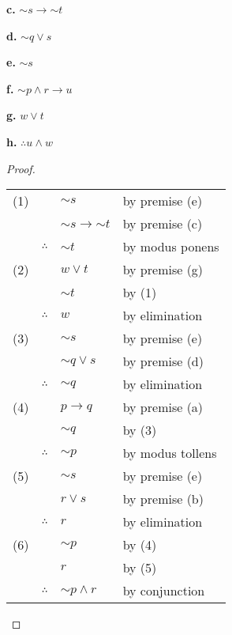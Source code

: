 \documentclass[14pt]{extarticle}
\begin{document}
{\bf c.} ${\sim s} \to {\sim t}$

{\bf d.} ${\sim q} \vee s$

{\bf e.} ${\sim s}$

{\bf f.} ${\sim p} \wedge r \to u$

{\bf g.} $w \vee t$

{\bf h.} $\therefore u \wedge w$

\begin{proof}
    \begin{tabular}{rrll}
        (1) &              & ${\sim s}$                & by premise (e)   \\
            &              & ${\sim s} \to {\sim t}$   & by premise (c)   \\
            & $\therefore$ & ${\sim t}$                & by modus ponens  \\
        (2) &              & $w \vee t$                & by premise (g)   \\
            &              & ${\sim t}$                & by (1)           \\
            & $\therefore$ & $w$                       & by elimination   \\
        (3) &              & ${\sim s}$                & by premise (e)   \\
            &              & ${\sim q} \vee s$         & by premise (d)   \\
            & $\therefore$ & ${\sim q}$                & by elimination   \\
        (4) &              & $p \to q$                 & by premise (a)   \\
            &              & ${\sim q}$                & by (3)           \\
            & $\therefore$ & ${\sim p}$                & by modus tollens \\
        (5) &              & ${\sim s}$                & by premise (e)   \\
            &              & $r \vee s$                & by premise (b)   \\
            & $\therefore$ & $r$                       & by elimination   \\
        (6) &              & ${\sim p}$                & by (4)           \\
            &              & $r$                       & by (5)           \\
            & $\therefore$ & ${\sim p} \wedge r$       & by conjunction   \\

\end{tabular}
\end{proof}
\end{document}
